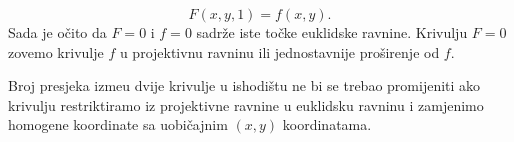  \label{Sec:2}
%

\begin{equation}
F(x,y,1)=f(x,y) \mathrm{.}
\end{equation}
Sada je o\v{c}ito da $F=0$ i $f=0$ sadr\v{z}e iste to\v{c}ke euklidske ravnine. Krivulju $F=0$
zovemo  krivulje $f$ u projektivnu ravninu ili jednostavnije pro\v{s}irenje
od $f$.

Broj presjeka izme\dj{}u dvije krivulje u ishodi\v{s}tu ne bi
se trebao promijeniti ako krivulju restriktiramo iz projektivne ravnine u
euklidsku ravninu i zamjenimo homogene koordinate sa uobi\v{c}ajnim $(x,y)$ koordinatama.

